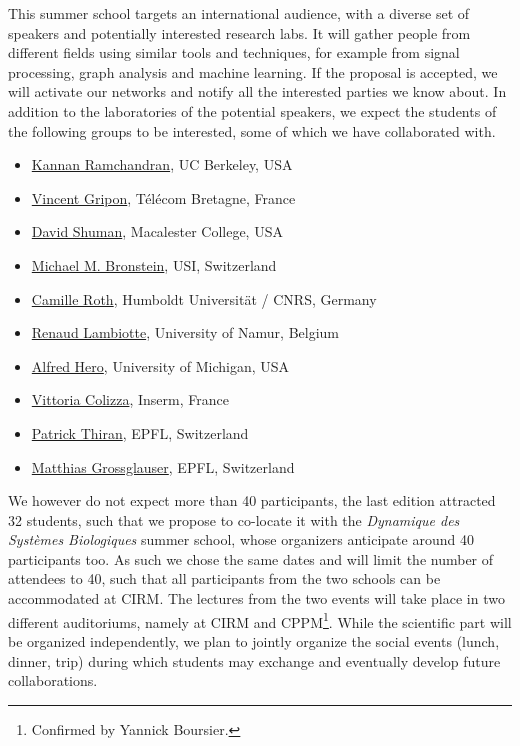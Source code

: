 \documentclass[a4paper]{scrartcl}
\begin{document}
This summer school targets an international audience, with a diverse set of
speakers and potentially interested research labs. It will gather people from
different fields using similar tools and techniques, for example from signal
processing, graph analysis and machine learning. If the proposal is accepted, we
will activate our networks and notify all the interested parties we know about.
In addition to the laboratories of the potential speakers, we expect the
students of the following groups to be interested, some of which we have
collaborated with.
\begin{itemize}
	\setlength{\itemsep}{0pt} \setlength{\parskip}{0pt}
	\item \href{https://www.eecs.berkeley.edu/~kannanr/}
		{Kannan Ramchandran}, UC Berkeley, USA
	\item \href{http://www.vincent-gripon.com/}
		{Vincent Gripon}, Télécom Bretagne, France
	\item \href{http://www.macalester.edu/~dshuman1/}
		{David Shuman}, Macalester College, USA
	\item \href{http://www.inf.usi.ch/bronstein/}
		{Michael M. Bronstein}, USI, Switzerland
	\item \href{http://camille.roth.free.fr/index.php}
		{Camille Roth}, Humboldt Universität / CNRS, Germany
	\item \href{http://xn.unamur.be/}
		{Renaud Lambiotte}, University of Namur, Belgium
	\item \href{https://web.eecs.umich.edu/~hero/}
		{Alfred Hero}, University of Michigan, USA
	\item \href{http://www.epicx-lab.com/vittoria-colizza.html}
		{Vittoria Colizza}, Inserm, France
	\item \href{http://people.epfl.ch/patrick.thiran}
		{Patrick Thiran}, EPFL, Switzerland
	\item \href{http://icapeople.epfl.ch/grossglauser/}
		{Matthias Grossglauser}, EPFL, Switzerland
\end{itemize}

We however do not expect more than 40 participants, the last edition attracted
32 students, such that we propose to co-locate it with the \textit{Dynamique des
Systèmes Biologiques} summer school, whose organizers anticipate around 40
participants too. As such we chose the same dates and will limit the number of
attendees to 40, such that all participants from the two schools can be
accommodated at CIRM. The lectures from the two events will take place in two
different auditoriums, namely at CIRM and CPPM\footnote{Confirmed by Yannick
Boursier.}. While the scientific part will be organized independently, we plan
to jointly organize the social events (lunch, dinner, trip) during which
students may exchange and eventually develop future collaborations.
\end{document}
